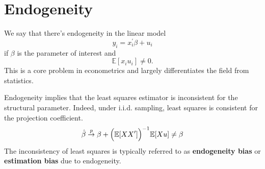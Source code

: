 \section{Endogeneity}
\label{sec:endogeneity}

We say that there's endogeneity in the linear model
\[y_i = x_i^{\prime} \beta + u_i\]
if $\beta$ is the parameter of interest and
\[\mathbb{E}[x_i u_i] \neq 0.\]
This is a core problem in econometrics and largely differentiates the field from statistics.

Endogeneity implies that the least squares estimator is inconsistent for the structural parameter.
Indeed, under i.i.d. sampling, least squares is consistent for the projection coefficient.
\begin{gather*}
    \hat{\beta} \overset{p}{\rightarrow} \beta + \Bigl(\mathbb{E}[X X^{\prime}] \Bigr)^{-1} \mathbb{E}[X u] \neq \beta 
\end{gather*}
The inconsistency of least squares is typically referred to as \textbf{endogeneity bias} or \textbf{estimation bias} due to
endogeneity.

